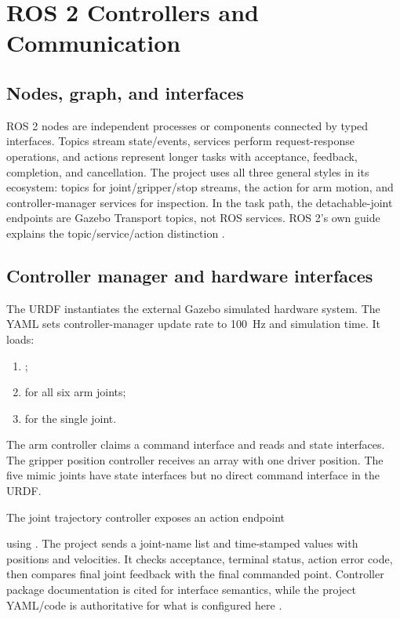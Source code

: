 \chapter{ROS 2 Controllers and Communication}
\label{ch:ros2}

\section{Nodes, graph, and interfaces}
ROS 2 nodes are independent processes or components connected by typed
interfaces. Topics stream state/events, services perform request-response
operations, and actions represent longer tasks with acceptance, feedback,
completion, and cancellation. The project uses all three general styles in
its ecosystem: topics for joint/gripper/stop streams, the
 action for arm motion, and controller-manager
services for inspection. In the task path, the detachable-joint endpoints are
Gazebo Transport topics, not ROS services. ROS 2's own guide explains the
topic/service/action distinction \cite{ros2_interfaces}.

\section{Controller manager and hardware interfaces}
The URDF instantiates the external Gazebo simulated hardware system. The YAML
sets controller-manager update rate to \SI{100}{Hz} and simulation time. It
loads:
\begin{enumerate}
 \item {};
 \item {} for
 all six arm joints;
 \item {} for the
 single  joint.
\end{enumerate}
The arm controller claims a  command interface and reads
 and  state interfaces. The gripper position
controller receives an array with one driver position. The five mimic joints
have state interfaces but no direct command interface in the URDF.

The joint trajectory controller exposes an action endpoint
\begin{center}\end{center}
using . The project sends a
joint-name list and time-stamped  values with
positions and velocities. It checks acceptance, terminal status, action error
code, then compares final joint feedback with the final commanded point.
Controller package documentation is cited for interface semantics, while the
project YAML/code is authoritative for what is configured here
\cite{ros2_control_jtc}.

